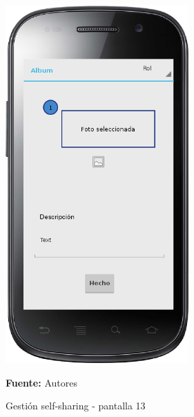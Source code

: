 \begin{figure}[!htb]
  \begin{center}
    \includegraphics[width=7cm]{./imagenes/UI/Self_sharing/self_sharing_13.png}
    \caption{Gestión self-sharing - pantalla 13}
    \label{fig:self_sharing_13}
    \textbf{Fuente:}  Autores
  \end{center}
\end{figure}

